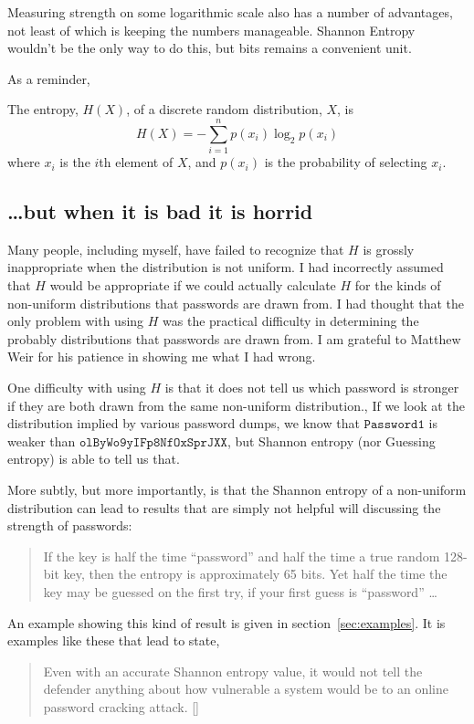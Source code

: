 \documentclass[12pt]{article}
\newcommand\pwd[1]{\ensuremath{\mathtt{#1}}}
\begin{document}
Measuring strength on some logarithmic scale also has a number of advantages, not least of which is keeping the numbers manageable. Shannon Entropy wouldn’t be the only way to do this, but bits remains a convenient unit.

As a reminder,
\begin{Definition}[Entropy]\label{def:H}
The entropy, $H(X)$, of a discrete random distribution, $X$, is
$$H(X) = -\sum_{i=1}^n p(x_i)\log_2p(x_i)$$
where $x_i$ is the $i$th element of $X$, and $p(x_i)$ is the probability of selecting $x_i$.
\end{Definition}



\subsection{\dots but when it is bad it is horrid}

Many people, including myself, have failed to recognize that $H$ is grossly inappropriate when the distribution is not uniform. I had incorrectly assumed that $H$ would be appropriate if we could actually calculate $H$ for the kinds of non-uniform distributions that passwords are drawn from. I had thought that the only problem with using $H$ was the practical difficulty in determining the probably distributions that passwords are drawn from. I am grateful to Matthew Weir for his patience in showing me what I had wrong.

One difficulty with using $H$ is that it does not tell us which password is stronger if they are both drawn from the same non-uniform distribution., If we look at the distribution implied by various password dumps, we know that  \pwd{Password1} is weaker than \pwd{olByWo9yIFp8NfOxSprJXX}, but Shannon entropy (nor Guessing entropy) is able to tell us that.

More subtly, but more importantly, is that the Shannon entropy of a non-uniform distribution can lead to results that are simply not helpful will discussing the strength of passwords:

\begin{quote}
If the key is half the time “password” and half the time a true random 128-bit key, then the entropy is approximately 65 bits. Yet half the time the key may be guessed on the first try, if your first guess is “password” \dots \parencite{wikipedia:entropy}
\end{quote}
An example showing this kind of result is given in section~\ref{sec:examples}. It is examples like these that lead \citeauthor{WeirETAL2010:CCS} to state,
\begin{quote}
Even with an accurate Shannon entropy value, it would not tell the defender anything about how vulnerable a system would be to an online password cracking attack. [\cite[p.~162]{WeirETAL2010:CCS}]
\end{quote}
\end{document}
